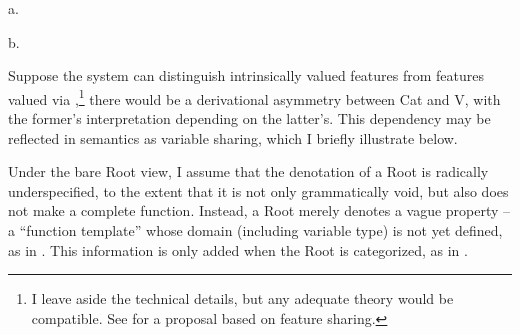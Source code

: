 \documentclass[output=paper]{langsci/langscibook}
\begin{document}
\ea\label{ex:catx}
{\upshape
\begin{minipage}[t]{0.4\textwidth}
    a.\hspace*{-6mm}
\end{minipage}
\begin{minipage}[t]{0.45\textwidth}
    b. 
\end{minipage}
}
\z

\noindent Suppose the system can distinguish intrinsically valued features from
features valued via ,\footnote{I leave aside the technical details, but any
adequate theory would be compatible. See \citet[10]{RooryckWyngaerd2011} for a
proposal based on feature sharing.} there would be a derivational asymmetry
between Cat\textsubscript{\textsurd} and V\textsubscript{\textsurd}, with the
former's interpretation depending on the latter's. This dependency may be
reflected in semantics as variable sharing, which I briefly illustrate below.

Under the bare Root view, I assume that the denotation of a Root is radically
underspecified, to the extent that it is not only grammatically void, but also
does not make a complete function. Instead, a Root merely denotes a vague
property -- a ``function template'' whose domain (including variable type) is
not yet defined, as in . This information is only added when the
Root is categorized, as in .
\end{document}
